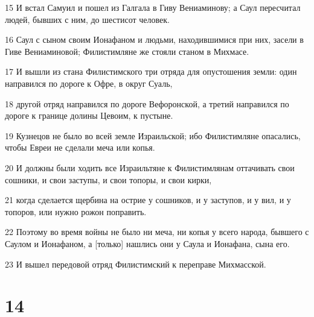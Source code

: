 \par 15 И встал Самуил и пошел из Галгала в Гиву Вениаминову; а Саул пересчитал людей, бывших с ним, до шестисот человек.
\par 16 Саул с сыном своим Ионафаном и людьми, находившимися при них, засели в Гиве Вениаминовой; Филистимляне же стояли станом в Михмасе.
\par 17 И вышли из стана Филистимского три отряда для опустошения земли: один направился по дороге к Офре, в округ Суаль,
\par 18 другой отряд направился по дороге Вефоронской, а третий направился по дороге к границе долины Цевоим, к пустыне.
\par 19 Кузнецов не было во всей земле Израильской; ибо Филистимляне опасались, чтобы Евреи не сделали меча или копья.
\par 20 И должны были ходить все Израильтяне к Филистимлянам оттачивать свои сошники, и свои заступы, и свои топоры, и свои кирки,
\par 21 когда сделается щербина на острие у сошников, и у заступов, и у вил, и у топоров, или нужно рожон поправить.
\par 22 Поэтому во время войны не было ни меча, ни копья у всего народа, бывшего с Саулом и Ионафаном, а [только] нашлись они у Саула и Ионафана, сына его.
\par 23 И вышел передовой отряд Филистимский к переправе Михмасской.

\chapter{14}

